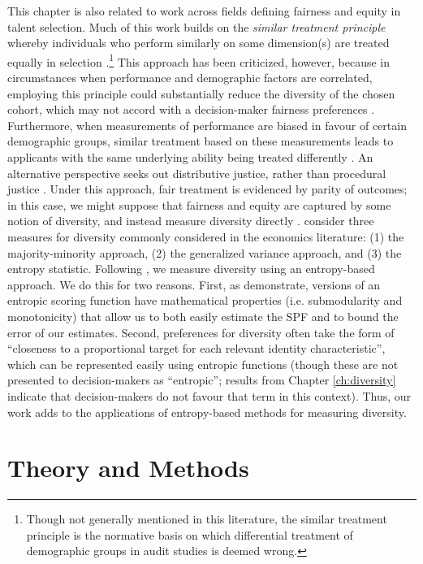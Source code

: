 This chapter is also related to work across fields defining fairness and equity in talent selection. Much of this work builds on the \emph{similar treatment principle} whereby individuals who perform similarly on some dimension(s) are treated equally in selection \cite{dwork_fairness_2012}.\footnote{Though not generally mentioned in this literature, the similar treatment principle is the normative basis on which differential treatment of demographic groups in audit studies is deemed wrong.} This approach has been criticized, however, because in circumstances when performance and demographic factors are correlated, employing this principle could substantially reduce the diversity of the chosen cohort, which may not accord with a decision-maker fairness preferences \cite{fleisher_whats_nodate}. Furthermore, when measurements of performance are biased in favour of certain demographic groups, similar treatment based on these measurements leads to applicants with the same underlying ability being treated differently \cite{fleisher_whats_nodate}. An alternative perspective seeks out distributive justice, rather than procedural justice \cite{Olsaretti_2018}. Under this approach, fair treatment is evidenced by parity of outcomes; in this case, we might suppose that fairness and equity are captured by some notion of diversity, and instead measure diversity directly \cite{Olsaretti_2018}. \textcite{budescu2012measure} consider three measures for diversity commonly considered in the economics literature: (1) the majority-minority approach, (2) the generalized variance approach, and (3) the entropy statistic. Following \textcite{huppenkothen2020entrofy}, we measure diversity using an entropy-based approach. We do this for two reasons. First, as \textcite{huppenkothen2020entrofy} demonstrate, versions of an entropic scoring function have mathematical properties (i.e. submodularity and monotonicity) that allow us to both easily estimate the SPF and to bound the error of our estimates. Second, preferences for diversity often take the form of ``closeness to a proportional target for each relevant identity characteristic'', which can be represented easily using entropic functions (though these are not presented to decision-makers as ``entropic''; results from Chapter \ref{ch:diversity} indicate that decision-makers do not favour that term in this context). Thus, our work adds to the applications of entropy-based methods for measuring diversity.

\section{Theory and Methods}\label{sec:spfmethod}
